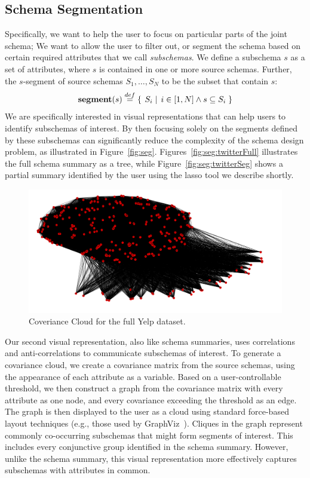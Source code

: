 \subsection{Schema Segmentation}
Specifically, we want to help the user to focus on particular parts of the joint schema;
We want to allow the user to filter out, or segment the schema based on certain required attributes that we call \emph{subschemas}.
We define a subschema $s$ as a set of attributes, where $s$ is contained in one or more source schemas.
Further, the $s$-segment of source schemas $S_1, \ldots, S_N$ to be the subset that contain $s$:
$$\textbf{segment}(s) \overset{def}{=} \left\{\left.\;{S_i}\;\right|\;{i \in [1,N] \wedge s \subseteq S_i}\;\right\}$$
We are specifically interested in visual representations that can help users to identify subschemas of interest.
By then focusing solely on the segments defined by these subschemas can significantly reduce the complexity of the schema design problem, as illustrated in Figure~\ref{fig:seg}.
Figures~\ref{fig:seg:twitterFull} illustrates the full schema summary as a tree, while Figure~\ref{fig:seg:twitterSeg} shows a partial summary identified by the user using the lasso tool we describe shortly.

\begin{figure}[H]
\includegraphics[width=1.0\linewidth]{SchemaSummarization/img/YelpCovMat.png}
\caption{Coveriance Cloud for the full Yelp dataset.}
\label{fig:cloud}
\end{figure}

Our second visual representation, also like schema summaries, uses correlations and anti-correlations to communicate subschemas of interest.
To generate a covariance cloud, we create a covariance matrix from the source schemas, using the appearance of each attribute as a variable.
Based on a user-controllable threshold, we then construct a graph from the covariance matrix with every attribute as one node, and every covariance exceeding the threshold as an edge.
The graph is then displayed to the user as a cloud using standard force-based layout techniques (e.g., those used by GraphViz~\cite{DBLP:conf/gd/EllsonGKNW00}).  
Cliques in the graph represent commonly co-occurring subschemas that might form segments of interest.  
This includes every conjunctive group identified in the schema summary.
However, unlike the schema summary, this visual representation more effectively captures subschemas with attributes in common.

